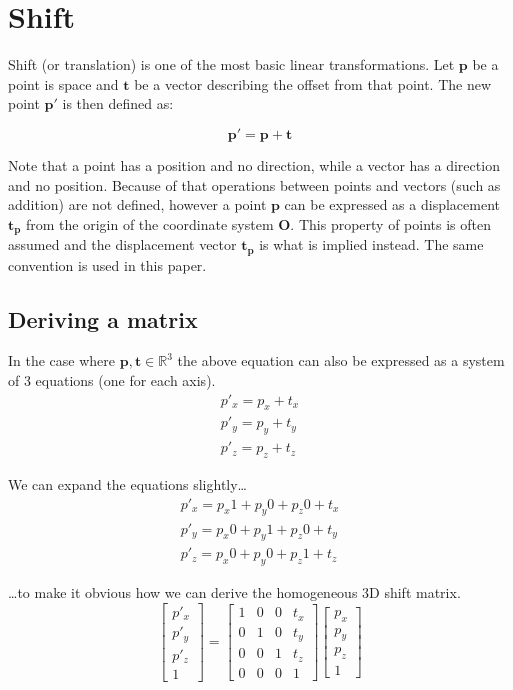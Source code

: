\documentclass[]{report}   %
\begin{document}
\section{Shift}

Shift (or translation) is one of the most basic linear transformations. Let \(\mathbf{p}\) be a point is space and \(\mathbf{t}\) be a vector describing the offset from that point. The new point \(\mathbf{p\prime}\) is then defined as:
\begin{mdframed}
\[
	\mathbf{p\prime} = \mathbf{p} + \mathbf{t}
\]
\end{mdframed}

Note that a point has a position and no direction, while a vector has a direction and no position. Because of that operations between points and vectors (such as addition) are not defined, however a point \(\mathbf{p}\) can be expressed as a displacement \(\mathbf{t_p}\) from the origin of the coordinate system \(\mathbf{O}\). This property of points is often assumed and the displacement vector \(\mathbf{t_p}\) is what is implied instead. The same convention is used in this paper.


\subsection{Deriving a matrix}
In the case where \(\mathbf{p}, \mathbf{t} \in \mathbb{R}^3\) the above equation can also be expressed as a system of 3 equations (one for each axis).
\begin{align*}
	p\prime_x = p_x + t_x	\\
	p\prime_y = p_y + t_y	\\
	p\prime_z = p_z + t_z
\end{align*}

We can expand the equations slightly\dots
\begin{align*}
	p\prime_x = p_x 1+p_y 0+p_z 0+t_x	\\
	p\prime_y = p_x 0+p_y 1+p_z 0+t_y	\\
	p\prime_z = p_x 0+p_y 0+p_z 1+t_z
\end{align*}

\dots to make it obvious how we can derive the homogeneous 3D shift matrix.
\[
	\begin{bmatrix}
	p\prime_x \\
	p\prime_y \\
	p\prime_z \\
	1
	\end{bmatrix}
	=	
	\begin{bmatrix}
	1 & 0 & 0 & t_x \\
	0 &	1 & 0 & t_y \\
	0 & 0 & 1 &	t_z \\
	0 & 0 & 0 &	1
	\end{bmatrix}
	\begin{bmatrix}
		p_x \\
		p_y \\
		p_z \\
		1
	\end{bmatrix}
\]
\end{document}
